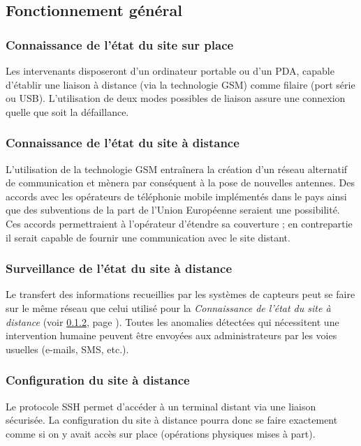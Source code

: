 \documentclass[a4paper, 11pt, draft]{article}
\newcommand\fullref[1]{\ref{#1}, page \pageref{#1}}
\begin{document}
\subsection{Fonctionnement général}

\subsubsection{Connaissance de l'état du site sur place}

Les intervenants disposeront d'un ordinateur portable ou d'un PDA, capable d'établir une liaison à distance (via la technologie GSM) comme filaire (port série ou USB). L'utilisation de deux modes possibles de liaison assure une connexion quelle que soit la défaillance.

\subsubsection{Connaissance de l'état du site à distance}
\label{subs:connaissance_etat_distance}

L'utilisation de la technologie GSM entraînera la création d'un réseau alternatif de communication et mènera par conséquent à la pose de nouvelles antennes. Des accords avec les opérateurs de téléphonie mobile implémentés dans le pays ainsi que des subventions de la part de l'Union Européenne seraient une possibilité. Ces accords permettraient à l'opérateur d'étendre sa couverture ; en contrepartie il serait capable de fournir une communication avec le site distant.

\subsubsection{Surveillance de l'état du site à distance}

Le transfert des informations recueillies par les systèmes de capteurs peut se faire sur le même réseau que celui utilisé pour la \emph{Connaissance de l'état du site à distance} (voir \fullref{subs:connaissance_etat_distance}). Toutes les anomalies détectées qui nécessitent une intervention humaine peuvent être envoyées aux administrateurs par les voies usuelles (e-mails, SMS, etc.).

\subsubsection{Configuration du site à distance}

Le protocole SSH permet d'accéder à un terminal distant via une liaison sécurisée. La configuration du site à distance pourra donc se faire exactement comme si on y avait accès sur place (opérations physiques mises à part).
\end{document}
